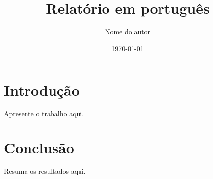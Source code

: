 \documentclass[12pt]{report}
\title{Relatório em português}
\author{Nome do autor}
\date{\today}
\begin{document}
\maketitle
\tableofcontents

\chapter{Introdução}
Apresente o trabalho aqui.

\chapter{Conclusão}
Resuma os resultados aqui.

% 
\end{document}
